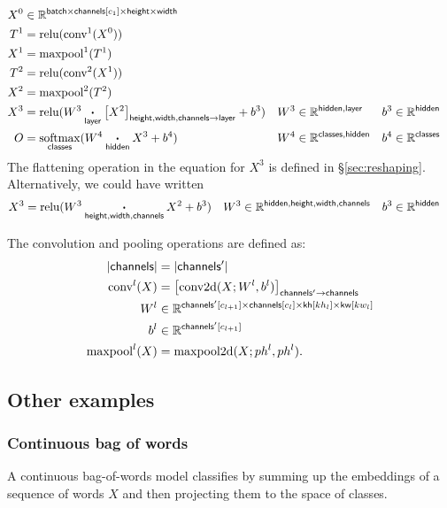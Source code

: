 \documentclass{article}
\newcommand{\reals}{\mathbb{R}}
\begin{document}
\begin{align*}
X^0 &\in \reals^{\name{batch} \times \nset{channels}{c_1} \times \name{height} \times \name{width}} \\
T^1 &= \text{relu}(\text{conv}^1(X^0)) \\
X^1 &= \text{maxpool}^1(T^1) \\
T^2 &= \text{relu}(\text{conv}^2(X^1)) \\
X^2 &= \text{maxpool}^2(T^2) \\
X^3 &= \text{relu}(W^3 \ndot{layer} \nmov{height,width,channels}{layer}{X^2} + b^3) & W^3 &\in \mathbb{R}^{\name{hidden}, \name{layer}} & b^3 &\in \mathbb{R}^{\name{hidden}} \\
O &= \nfun{classes}{softmax} (W^4 \ndot{hidden} X^3 + b^4) & W^4 &\in \mathbb{R}^{\name{classes}, \name{hidden}} & b^4 &\in \mathbb{R}^{\name{classes}}
\end{align*}
The flattening operation in the equation for $X^3$ is defined in \S{\ref{sec:reshaping}}. Alternatively, we could have written
\begin{align*}
X^3 &= \text{relu}(W^3 \mathbin{\mathop{\boldsymbol\cdot}\limits_{\mathsf{height,width,channels}}} X^2 + b^3) & W^3 &\in \mathbb{R}^{\mathsf{hidden},\mathsf{height},\mathsf{width},\mathsf{channels}} & b^3 &\in \mathbb{R}^{\mathsf{hidden}}
\end{align*}

The convolution and pooling operations are defined as:
\begin{align*}
|\name{channels}| &= |\name{channels'}| \\
\text{conv}^l(X) &= \nmov{channels'}{channels}{\text{conv2d}(X; W^l, b^l)} \\
W^l & \in \reals^{\nset{channels'}{c_{l+1}} \times \nset{channels}{c_l} \times \nset{kh}{kh_l} \times \nset{kw}{kw_l}} \\
b^l &\in \reals^{\nset{channels'}{c_{l+1}}} \\
\text{maxpool}^l(X) &= \text{maxpool2d}(X; ph^l, ph^l).
\end{align*}

\subsection{Other examples}

\subsubsection{Continuous bag of words}

A continuous bag-of-words model classifies by summing up the embeddings of a sequence of words $X$ and then projecting them to the space of classes. 
\end{document}

